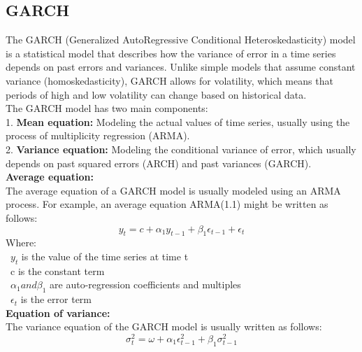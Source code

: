 \documentclass{ieeeojies}
\begin{document}
\subsection{GARCH}
The GARCH (Generalized AutoRegressive Conditional Heteroskedasticity) model is a statistical model that describes how the variance of error in a time series depends on past errors and variances. Unlike simple models that assume constant variance (homoskedasticity), GARCH allows for volatility, which means that periods of high and low volatility can change based on historical data.\\
The GARCH model has two main components:\\
1.	\textbf{Mean equation:} Modeling the actual values of time series, usually using the process of multiplicity regression (ARMA).\\
2.	\textbf{Variance equation:} Modeling the conditional variance of error, which usually depends on past squared errors (ARCH) and past variances (GARCH).\\
\textbf{Average equation:}\\
The average equation of a GARCH model is usually modeled using an ARMA process. For example, an average equation ARMA(1.1) might be written as follows:
\begin{equation}
    y_t = c + \alpha_1 y_{t-1} + \beta_1 \epsilon_{t-1} + \epsilon_t
\end{equation} \cite{tranggarch3}
Where:\\
\textbullet \ ${y_t}$ is the value of the time series at time t\\
\textbullet \ c is the constant term\\
\textbullet \ $\alpha_1 and \beta_1$ are auto-regression coefficients and multiples\\
\textbullet \ ${\epsilon_t}$ is the error term\\
\textbf{Equation of variance:}\\
The variance equation of the GARCH model is usually written as follows:
\begin{equation}
    \sigma_t^2 = \omega + \alpha_1 \epsilon_{t-1}^2 + \beta_1 \sigma_{t-1}^2
\end{equation} \cite{tranggarch2}
\end{document}
